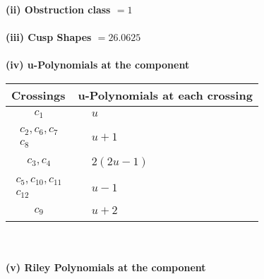 \documentclass[1p]{elsarticle_modified}
\theoremstyle{definition}
\begin{document}
\flushleft \textbf{(ii) Obstruction class $= 1$}\\~\\
\flushleft \textbf{(iii) Cusp Shapes $= 26.0625$}\\~\\
\newpage\renewcommand{\arraystretch}{1}
\flushleft \textbf{(iv) u-Polynomials at the component}\newline \\
\begin{tabular}{m{50pt}|m{274pt}}
Crossings & \hspace{64pt}u-Polynomials at each crossing \\
\hline $$\begin{aligned}c_{1}\end{aligned}$$&$\begin{aligned}
&u
\end{aligned}$\\
\hline $$\begin{aligned}c_{2},c_{6},c_{7}\\c_{8}\end{aligned}$$&$\begin{aligned}
&u+1
\end{aligned}$\\
\hline $$\begin{aligned}c_{3},c_{4}\end{aligned}$$&$\begin{aligned}
&2(2 u-1)
\end{aligned}$\\
\hline $$\begin{aligned}c_{5},c_{10},c_{11}\\c_{12}\end{aligned}$$&$\begin{aligned}
&u-1
\end{aligned}$\\
\hline $$\begin{aligned}c_{9}\end{aligned}$$&$\begin{aligned}
&u+2
\end{aligned}$\\
\hline
\end{tabular}\\~\\
\newpage\renewcommand{\arraystretch}{1}
\flushleft \textbf{(v) Riley Polynomials at the component}\newline \\
\end{document}
